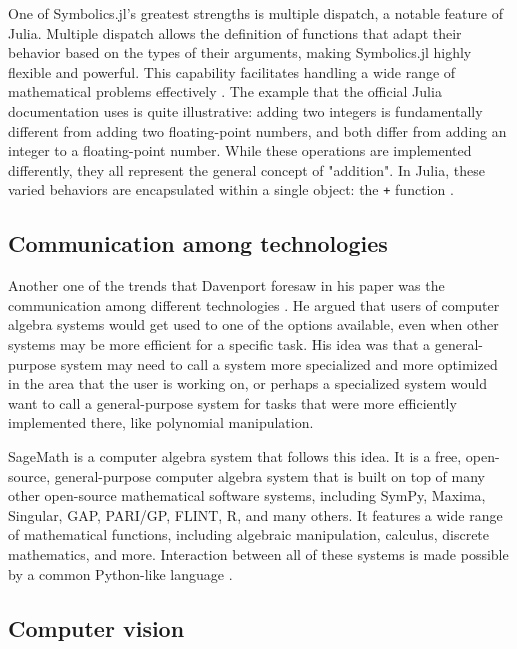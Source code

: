 One of Symbolics.jl's greatest strengths is multiple dispatch, a notable feature of Julia. Multiple dispatch allows the definition of functions that adapt their behavior based on the types of their arguments, making Symbolics.jl highly flexible and powerful. This capability facilitates handling a wide range of mathematical problems effectively \parencite{gowda2021high}. The example that the official Julia documentation uses is quite illustrative: adding two integers is fundamentally different from adding two floating-point numbers, and both differ from adding an integer to a floating-point number. While these operations are implemented differently, they all represent the general concept of "addition". In Julia, these varied behaviors are encapsulated within a single object: the \verb|+| function \parencite{bezanson2017julia}.

\subsection{Communication among technologies}\label{subsec:communication-among-technologies}

Another one of the trends that Davenport foresaw in his paper was the communication among different technologies \parencite{davenport1994computer}. He argued that users of computer algebra systems would get used to one of the options available, even when other systems may be more efficient for a specific task. His idea was that a general-purpose system may need to call a system more specialized and more optimized in the area that the user is working on, or perhaps a specialized system would want to call a general-purpose system for tasks that were more efficiently implemented there, like polynomial manipulation.

SageMath is a computer algebra system that follows this idea. It is a free, open-source, general-purpose computer algebra system that is built on top of many other open-source mathematical software systems, including SymPy, Maxima, Singular, GAP, PARI/GP, FLINT, R, and many others.  It features a wide range of mathematical functions, including algebraic manipulation, calculus, discrete mathematics, and more. Interaction between all of these systems is made possible by a common Python-like language \parencite{stein2005sage,sagemath}.

\subsection{Computer vision}\label{subsec:computer-vision}

